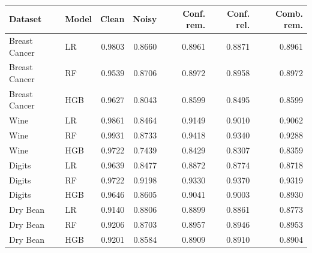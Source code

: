 \begin{tabular}{llrrrrr}
\toprule
Dataset & Model & Clean & Noisy & Conf. rem. & Conf. rel. & Comb. rem. \\
\midrule
Breast Cancer & LR & 0.9803 & 0.8660 & 0.8961 & 0.8871 & 0.8961 \\
Breast Cancer & RF & 0.9539 & 0.8706 & 0.8972 & 0.8958 & 0.8972 \\
Breast Cancer & HGB & 0.9627 & 0.8043 & 0.8599 & 0.8495 & 0.8599 \\
Wine & LR & 0.9861 & 0.8464 & 0.9149 & 0.9010 & 0.9062 \\
Wine & RF & 0.9931 & 0.8733 & 0.9418 & 0.9340 & 0.9288 \\
Wine & HGB & 0.9722 & 0.7439 & 0.8429 & 0.8307 & 0.8359 \\
Digits & LR & 0.9639 & 0.8477 & 0.8872 & 0.8774 & 0.8718 \\
Digits & RF & 0.9722 & 0.9198 & 0.9330 & 0.9370 & 0.9319 \\
Digits & HGB & 0.9646 & 0.8605 & 0.9041 & 0.9003 & 0.8930 \\
Dry Bean & LR & 0.9140 & 0.8806 & 0.8899 & 0.8861 & 0.8773 \\
Dry Bean & RF & 0.9206 & 0.8703 & 0.8957 & 0.8946 & 0.8953 \\
Dry Bean & HGB & 0.9201 & 0.8584 & 0.8909 & 0.8910 & 0.8904 \\
\bottomrule
\end{tabular}
